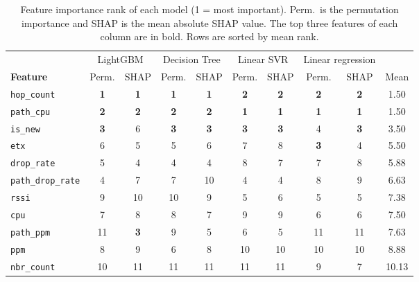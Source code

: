 \begin{table}[htbp]
    \centering
    \small
    \caption{Feature importance rank of each model (1 = most
        important). Perm.\ is the permutation importance and SHAP is
        the mean absolute SHAP value. The top three features of each
    column are in bold. Rows are sorted by mean rank.}
    \label{tab:fi_all}
    \begin{tabular}{l|cc|cc|cc|cc|c}
        \hline
        & \multicolumn{2}{c|}{LightGBM}
        & \multicolumn{2}{c|}{Decision Tree}
        & \multicolumn{2}{c|}{Linear SVR}
        & \multicolumn{2}{c|}{Linear regression}
        & \\
        \cline{2-9}
        \textbf{Feature}
        & Perm. & SHAP & Perm. & SHAP & Perm. & SHAP & Perm. & SHAP
        & Mean \\
        \hline
        \texttt{hop\_count}       & \textbf{1} & \textbf{1} & \textbf{1} &
        \textbf{1} & \textbf{2} & \textbf{2} & \textbf{2} & \textbf{2} & 1.50 \\
        \texttt{path\_cpu}        & \textbf{2} & \textbf{2} & \textbf{2} &
        \textbf{2} & \textbf{1} & \textbf{1} & \textbf{1} & \textbf{1} & 1.50 \\
        \texttt{is\_new}          & \textbf{3} & 6 & \textbf{3} &
        \textbf{3} & \textbf{3} & \textbf{3} & 4 & \textbf{3} & 3.50 \\
        \texttt{etx}              & 6 & 5 & 5 & 6 & 7 & 8 & \textbf{3} & 4
        & 5.50 \\
        \texttt{drop\_rate}       & 5 & 4 & 4 & 4 & 8 & 7 & 7 & 8 & 5.88 \\
        \texttt{path\_drop\_rate} & 4 & 7 & 7 & 10 & 4 & 4 & 8 & 9 & 6.63
        \\
        \texttt{rssi}             & 9 & 10 & 10 & 9 & 5 & 6 & 5 & 5 & 7.38
        \\
        \texttt{cpu}              & 7 & 8 & 8 & 7 & 9 & 9 & 6 & 6 & 7.50 \\
        \texttt{path\_ppm}        & 11 & \textbf{3} & 9 & 5 & 6 & 5 & 11 &
        11 & 7.63 \\
        \texttt{ppm}              & 8 & 9 & 6 & 8 & 10 & 10 & 10 & 10 &
        8.88 \\
        \texttt{nbr\_count}       & 10 & 11 & 11 & 11 & 11 & 11 & 9 & 7 &
        10.13 \\
        \hline
    \end{tabular}
\end{table}

